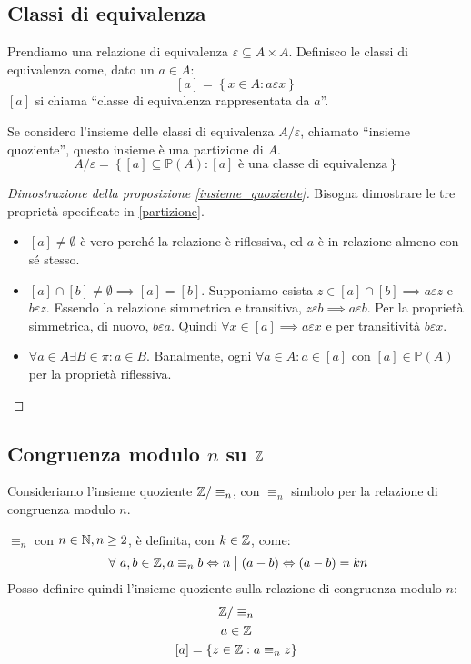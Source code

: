 \subsection{Classi di equivalenza}
\begin{defn}
Prendiamo una relazione di equivalenza $\varepsilon \subseteq A \times A$. Definisco le classi di equivalenza come, dato un $a \in A$:
\[
[a] = \left \{ x \in A : a \varepsilon x \right\}
\]
$[a]$ si chiama ``classe di equivalenza rappresentata da $a$''.
\end{defn}
\begin{prop}
Se considero l'insieme delle classi di equivalenza $A / \varepsilon$, chiamato ``insieme quoziente'', questo insieme \`e una partizione di $A$.
\[
A/\varepsilon = \left\{ [a] \subseteq \mathbb{P}(A) : [a] \text{ \`e una classe di equivalenza} \right\}
\]
\end{prop}
\begin{proof}[Dimostrazione della proposizione \ref{insieme_quoziente}]
Bisogna dimostrare le tre propriet\`a specificate in \ref{partizione}.
\begin{itemize}
  \item $[a] \neq \emptyset$ \`e vero perch\'e la relazione \`e riflessiva, ed $a$ \`e in relazione almeno con s\'e stesso.
  \item $[a] \cap [b] \neq \emptyset \implies [a] = [b]$. Supponiamo esista $z \in [a] \cap [b] \implies a \varepsilon z$ e $b \varepsilon z$. Essendo la relazione simmetrica e transitiva, $z \varepsilon b \implies a \varepsilon b$. Per la propriet\`a simmetrica, di nuovo, $b \varepsilon a$. Quindi $ \forall x \in [a] \implies a \varepsilon x $ e per transitivit\`a $ b \varepsilon x$.
  \item $\forall a \in A \exists B \in \pi : a \in B$. Banalmente, ogni $\forall a \in A : a \in [a]$ con $[a] \in \mathbb{P}(A)$ per la propriet\`a riflessiva.
\end{itemize}
\end{proof}

\subsection{Congruenza modulo $n$ su $\mathbb{Z}$}

Consideriamo l'insieme quoziente $\mathbb{Z} / \equiv_{n}$, con $\equiv_{n} $ simbolo per la relazione di congruenza modulo $n$.

$\equiv_{n}$ con $n \in \mathbb{N}, n \ge 2$, \`e definita, con $ k \in \mathbb{Z}$, come:
\[
\forall a, b \in \integers, a \equiv_{n} b \iff n \divides (a - b) \iff (a - b) = k n 
\]
Posso definire quindi l'insieme quoziente sulla relazione di congruenza modulo $n$:
\begin{gather*}
\mathbb{Z} / \equiv_{n} \\
a \in \mathbb{Z} \\
[a] = \left \{ z \in \mathbb{Z} : a \equiv_{n} z \right \}
\end{gather*}


